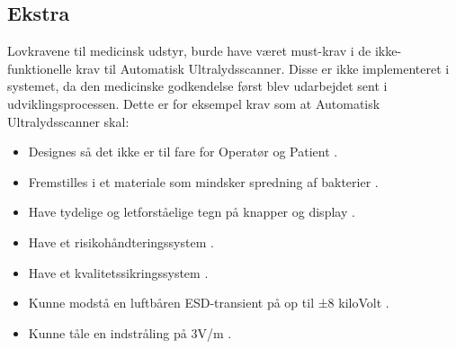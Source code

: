 \subsection{Ekstra}
Lovkravene til medicinsk udstyr, burde have været must-krav i de ikke-funktionelle krav til Automatisk Ultralydsscanner. Disse er ikke implementeret i systemet, da den medicinske godkendelse først blev udarbejdet sent i udviklingsprocessen. Dette er for eksempel krav som at Automatisk Ultralydsscanner skal: 
\begin{itemize}
\item Designes så det ikke er til fare for Operatør og Patient \cite{MDD}. 
\item Fremstilles i et materiale som mindsker spredning af bakterier \cite{MDD}. 
\item Have tydelige og letforståelige tegn på knapper og display \cite{MDD}.
\item Have et risikohåndteringssystem \cite{13485}.
\item Have et kvalitetssikringssystem \cite{14971}. 
\item Kunne modstå en luftbåren ESD-transient på op til ±8 kiloVolt \cite{60601}.
\item Kunne tåle en indstråling på 3V/m \cite{60601}.
\end{itemize}